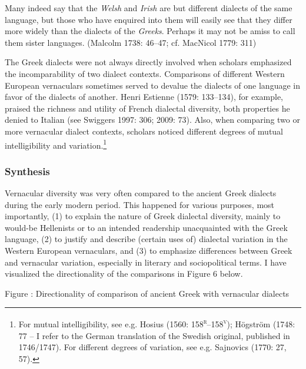 \begin{styleQuote}
Many indeed say that the \textit{Welsh} and \textit{Irish} are but different dialects of the same language, but those who have enquired into them will easily see that they differ more widely than the dialects of the \textit{Greeks}. Perhaps it may not be amiss to call them sister languages. (Malcolm 1738: 46–47; cf. MacNicol 1779: 311)
\end{styleQuote}

\begin{styleStandard}
The Greek dialects were not always directly involved when scholars emphasized the incomparability of two dialect contexts. Comparisons of different Western European vernaculars sometimes served to devalue the dialects of one language in favor of the dialects of another. Henri Estienne (1579: 133–134), for example, praised the richness and utility of French dialectal diversity, both properties he denied to Italian (see Swiggers 1997: 306; 2009: 73). Also, when comparing two or more vernacular dialect contexts, scholars noticed different degrees of mutual intelligibility and variation.\footnote{ For mutual intelligibility, see e.g. Hosius (1560: 158\textsc{\textsuperscript{r}}\textsc{–158}\textsc{\textsuperscript{v}}); Högström (1748: 77 – I refer to the German translation of the Swedish original, published in 1746/1747). For different degrees of variation, see e.g. Sajnovics (1770: 27, 57).}
\end{styleStandard}

\subsubsection{Synthesis}
\hypertarget{Toc19704862}{}\begin{styleStandard}
Vernacular diversity was very often compared to the ancient Greek dialects during the early modern period. This happened for various purposes, most importantly, (1) to explain the nature of Greek dialectal diversity, mainly to would-be Hellenists or to an intended readership unacquainted with the Greek language, (2) to justify and describe (certain uses of) dialectal variation in the Western European vernaculars, and (3) to emphasize differences between Greek and vernacular variation, especially in literary and sociopolitical terms. I have visualized the directionality of the comparisons in Figure 6 below.
\end{styleStandard}

\begin{stylecaption}
Figure : Directionality of comparison of ancient Greek with vernacular dialects
\end{stylecaption}

